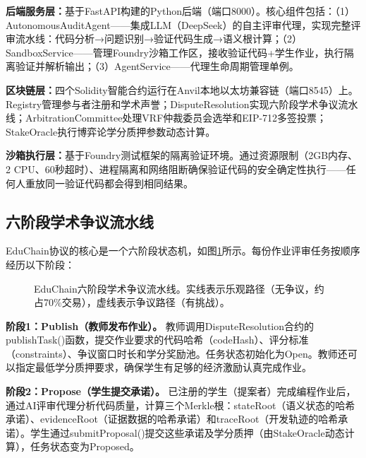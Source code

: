 \documentclass[10.5pt,compsoc]{CjC}
\begin{document}
\textbf{后端服务层：}基于FastAPI构建的Python后端（端口8000）。核心组件包括：（1）AutonomousAuditAgent——集成LLM（DeepSeek）的自主评审代理，实现完整评审流水线：代码分析→问题识别→验证代码生成→语义根计算；（2）SandboxService——管理Foundry沙箱工作区，接收验证代码+学生作业，执行隔离验证并解析输出；（3）AgentService——代理生命周期管理单例。

\textbf{区块链层：}四个Solidity智能合约运行在Anvil本地以太坊兼容链（端口8545）上。Registry管理参与者注册和学术声誉；DisputeResolution实现六阶段学术争议流水线；ArbitrationCommittee处理VRF仲裁委员会选举和EIP-712多签投票；StakeOracle执行博弈论学分质押参数动态计算。

\textbf{沙箱执行层：}基于Foundry测试框架的隔离验证环境。通过资源限制（2GB内存、2 CPU、60秒超时）、进程隔离和网络阻断确保验证代码的安全确定性执行——任何人重放同一验证代码都会得到相同结果。

\subsection{六阶段学术争议流水线}

EduChain协议的核心是一个六阶段状态机，如图\ref{fig:pipeline}所示。每份作业评审任务按顺序经历以下阶段：

\begin{figure}[H]
\centering
{}
\caption{EduChain六阶段学术争议流水线。实线表示乐观路径（无争议，约占70\%交易），虚线表示争议路径（有挑战）。}
\label{fig:pipeline}
\end{figure}

\textbf{阶段1：Publish（教师发布作业）。} 教师调用DisputeResolution合约的publishTask()函数，提交作业要求的代码哈希（codeHash）、评分标准（constraints）、争议窗口时长和学分奖励池。任务状态初始化为Open。教师还可以指定最低学分质押要求，确保学生有足够的经济激励认真完成作业。

\textbf{阶段2：Propose（学生提交承诺）。} 已注册的学生（提案者）完成编程作业后，通过AI评审代理分析代码质量，计算三个Merkle根：stateRoot（语义状态的哈希承诺）、evidenceRoot（证据数据的哈希承诺）和traceRoot（开发轨迹的哈希承诺）。学生通过submitProposal()提交这些承诺及学分质押（由StakeOracle动态计算），任务状态变为Proposed。
\end{document}
